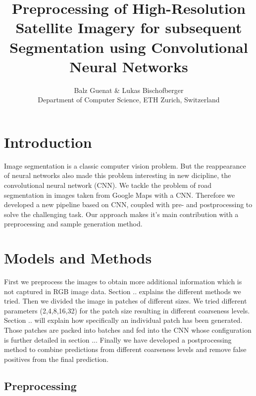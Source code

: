 \documentclass[10pt,conference,compsocconf]{IEEEtran}
\begin{document}
\title{Preprocessing of High-Resolution Satellite Imagery for subsequent \\Segmentation using Convolutional Neural Networks}

\author{
 Balz Guenat \& Lukas Bischofberger\\
  Department of Computer Science, ETH Zurich, Switzerland
}

\maketitle

\begin{abstract}
  
\end{abstract}

\section{Introduction}
Image segmentation is a classic computer vision problem. But the reappearance of neural networks also made this problem interesting in new dicipline, the convolutional neural network (CNN). We tackle the problem of road segmentation in images taken from Google Maps with a CNN. Therefore we developed a new pipeline based on CNN, coupled with pre- and postprocessing to solve the challenging task. Our approach makes it's main contribution with a preprocessing and sample generation method.

\section{Models and Methods}
First we preprocess the images to obtain more additional information which is not captured in RGB image data. Section .. explains the different methods we tried.
Then we divided the image in patches of different sizes. We tried different parameters (2,4,8,16,32) for the patch size resulting in different coarseness levels. Section .. will explain how specifically an individual patch has been generated. Those patches are packed into batches and fed into the CNN whose configuration is further detailed in section ... Finally we have developed a postprocessing method to combine predictions from different coarseness levels and remove false positives from the final prediction.

\subsection{Preprocessing}
\end{document}
